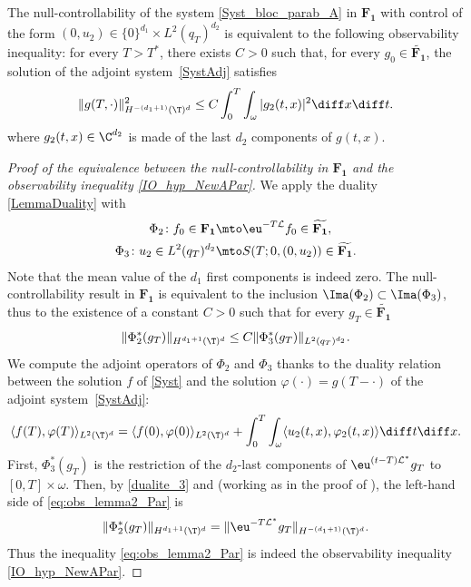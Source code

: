 The null-controllability of the system \eqref{Syst_bloc_parab_A} in $\mathbf{F_1}$ with control of the form $(0,u_2)\in\{0\}^{d_1}\times L^2(q_T)^{d_2}$ is equivalent to the following observability inequality: for every $T>T^\ast$, there exists $C>0$ such that, for every $g_0 \in \widetilde{\mathbf{F_1}}$, the solution of the adjoint system~\eqref{SystAdj} satisfies
\begin{equation}
\label{IO_hyp_NewAPar}
\| g(T,\cdot) \|_{H^{-(d_1+1)}(\T)^{d}}^2 \leq C \int_0^T \int_{\omega} |g_2(t,x)|^2 \diff x \diff t.
\end{equation}
where $g_2(t,x)\in\C^{d_2}$ is made of the last $d_2$ components of $g(t,x)$.
\begin{proof}[Proof of the equivalence between the null-controllability in $\mathbf{F_1}$ and the observability inequality \eqref{IO_hyp_NewAPar}]
We apply the duality \cref{LemmaDuality} with
\begin{align*}
\Phi_2 \colon f_0 \in \mathbf{F_1} &\mto \eu^{-T \mathcal{L}} f_0 \in \widetilde{\mathbf{F_1}},
\\
\Phi_3 \colon u_2 \in L^2(q_T)^{d_2} &\mto S(T;0,(0,u_2)) \in \widetilde{\mathbf{F_1}}.
\end{align*}
Note that the mean value of the $d_1$ first components is indeed zero.
The null-controllability result in $\mathbf{F_1}$ is equivalent to the inclusion $\Ima(\Phi_2)\subset \Ima(\Phi_3)$, thus to the existence of a constant $C>0$ such that for every $g_T\in \widetilde{\mathbf{F_1}}$
\begin{equation}\label{eq:obs_lemma2_Par}
\lVert\Phi_2^*(g_T)\rVert_{H^{d_1+1}(\T)^{d}}\leq C\lVert \Phi_3^*(g_T)\rVert_{L^2(q_T)^{d_2}}.
\end{equation}
We compute the adjoint operators of $\Phi_2$ and $\Phi_3$ thanks to the duality relation between the solution $f$ of \eqref{Syst} and the solution $\varphi(\cdot)= g(T-\cdot)$ of the adjoint system~\eqref{SystAdj}:
\begin{equation} \label{dualite_3}
\langle f(T), \varphi(T) \rangle_{L^2(\T)^d} = \langle f(0), \varphi(0) \rangle_{L^2(\T)^d} + \int_{0}^{T}\int_{\omega} \langle u_2(t,x), \varphi_2(t,x) \rangle \diff t \diff x.
\end{equation}
First, $\Phi_3^*(g_T)$ is the restriction of the $d_2$-last components of $\eu^{(t-T)\mathcal L^*}g_T$ to $[0,T]\times \omega$. Then, by \eqref{dualite_3} and  (working as in the proof of ), the left-hand side of \eqref{eq:obs_lemma2_Par} is
\[
\lVert\Phi_2^*(g_T)\rVert_{H^{d_1+1}(\T)^{d}} = \|\eu^{-T\mathcal{L}^*} g_T\|_{H^{-(d_1+1)}(\T)^{d}}.
\]
Thus the inequality \eqref{eq:obs_lemma2_Par} is indeed the observability inequality \eqref{IO_hyp_NewAPar}.
\end{proof}
